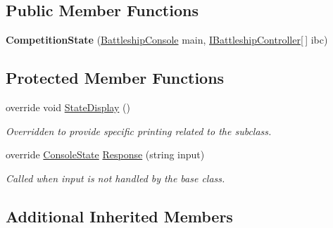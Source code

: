\subsection*{Public Member Functions}
\begin{DoxyCompactItemize}
\item 
\hypertarget{class_m_b_c_1_1_core_1_1_competition_state_a1c1cb78f023e48b66e4b674e179d4283}{{\bfseries Competition\-State} (\hyperlink{class_m_b_c_1_1_core_1_1_battleship_console}{Battleship\-Console} main, \hyperlink{interface_m_b_c_1_1_core_1_1_i_battleship_controller}{I\-Battleship\-Controller}\mbox{[}$\,$\mbox{]} ibc)}\label{class_m_b_c_1_1_core_1_1_competition_state_a1c1cb78f023e48b66e4b674e179d4283}

\end{DoxyCompactItemize}
\subsection*{Protected Member Functions}
\begin{DoxyCompactItemize}
\item 
\hypertarget{class_m_b_c_1_1_core_1_1_competition_state_a24e6c7016fe5d4eaadb2460a70e3d27c}{override void \hyperlink{class_m_b_c_1_1_core_1_1_competition_state_a24e6c7016fe5d4eaadb2460a70e3d27c}{State\-Display} ()}\label{class_m_b_c_1_1_core_1_1_competition_state_a24e6c7016fe5d4eaadb2460a70e3d27c}

\begin{DoxyCompactList}\small\item\em Overridden to provide specific printing related to the subclass.\end{DoxyCompactList}\item 
override \hyperlink{class_m_b_c_1_1_core_1_1_console_state}{Console\-State} \hyperlink{class_m_b_c_1_1_core_1_1_competition_state_a053b69f4d127ea8beab873137503ed36}{Response} (string input)
\begin{DoxyCompactList}\small\item\em Called when input is not handled by the base class.\end{DoxyCompactList}\end{DoxyCompactItemize}
\subsection*{Additional Inherited Members}


